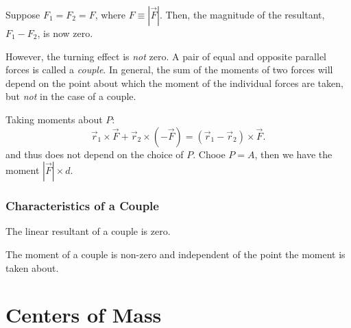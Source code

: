 \documentclass[12pt]{article}
\begin{document}
Suppose $F_{1} = F_{2} = F$, where $F \equiv |\vec{F}|$.
Then, the magnitude of the resultant, $F_{1} - F_{2}$, is now zero.

\begin{center}
\end{center}
However, the turning effect is \emph{not} zero.
A pair of equal and opposite parallel forces
is called a \emph{couple}.
In general, the sum of the moments of two forces
will depend on the point about which the moment
of the individual forces are taken,
but \emph{not} in the case of a couple.

\begin{center}
\end{center}

Taking moments about $P$:
\[
    \vec{r}_1 \times \vec{F} + \vec{r}_2 \times (-\vec{F}) = (\vec{r}_{1} - \vec{r}_{2}) \times \vec{F}.
\]
and thus does not depend on the choice of $P$.
Chooe $P = A$, then we have the moment $|\vec{F}|\times d$.

\subsubsection*{Characteristics of a Couple}
\begin{compactenum}
\item The linear resultant of a couple is zero.
\item The moment of a couple is non-zero and independent of the
    point the moment is taken about.
\end{compactenum}

\section{Centers of Mass}
\end{document}
